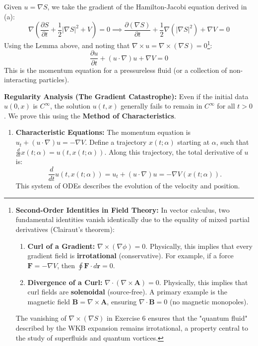 \begin{solution}
Given $u = \nabla S$, we take the gradient of the Hamilton-Jacobi equation derived in (a):
\[ \nabla \left( \frac{\partial S}{\partial t} + \frac{1}{2} |\nabla S|^2 + V \right) = 0 \implies \frac{\partial (\nabla S)}{\partial t} + \frac{1}{2} \nabla (|\nabla S|^2) + \nabla V = 0 \]
Using the Lemma above, and noting that $\nabla \times u = \nabla \times (\nabla S) = 0$\footnote{\textbf{Second-Order Identities in Field Theory:} In vector calculus, two fundamental identities vanish identically due to the equality of mixed partial derivatives (Clairaut's theorem):
\begin{enumerate}
    \item \textbf{Curl of a Gradient:} $\nabla \times (\nabla \phi) = 0$. Physically, this implies that every gradient field is \textbf{irrotational} (conservative). For example, if a force $\mathbf{F} = -\nabla V$, then $\oint \mathbf{F} \cdot d\mathbf{r} = 0$.
    \item \textbf{Divergence of a Curl:} $\nabla \cdot (\nabla \times \mathbf{A}) = 0$. Physically, this implies that curl fields are \textbf{solenoidal} (source-free). A primary example is the magnetic field $\mathbf{B} = \nabla \times \mathbf{A}$, ensuring $\nabla \cdot \mathbf{B} = 0$ (no magnetic monopoles).
\end{enumerate}
The vanishing of $\nabla \times (\nabla S)$ in Exercise 6 ensures that the "quantum fluid" described by the WKB expansion remains irrotational, a property central to the study of superfluids and quantum vortices.}:
\[ \boxed{\frac{\partial u}{\partial t} + (u \cdot \nabla)u + \nabla V = 0} \]
This is the momentum equation for a pressureless fluid (or a collection of non-interacting particles).

\textbf{Regularity Analysis (The Gradient Catastrophe):}
Even if the initial data $u(0, x)$ is $C^\infty$, the solution $u(t, x)$ generally fails to remain in $C^\infty$ for all $t > 0$. We prove this using the \textbf{Method of Characteristics}.

\begin{enumerate}
    \item \textbf{Characteristic Equations:}
    The momentum equation is $u_t + (u \cdot \nabla)u = -\nabla V$. Define a trajectory $x(t; \alpha)$ starting at $\alpha$, such that $\frac{d}{dt} x(t; \alpha) = u(t, x(t; \alpha))$. Along this trajectory, the total derivative of $u$ is:
    \[ \frac{d}{dt} u(t, x(t; \alpha)) = u_t + (u \cdot \nabla)u = -\nabla V(x(t; \alpha)). \]
    This system of ODEs describes the evolution of the velocity and position.


\end{enumerate}
\end{solution}
